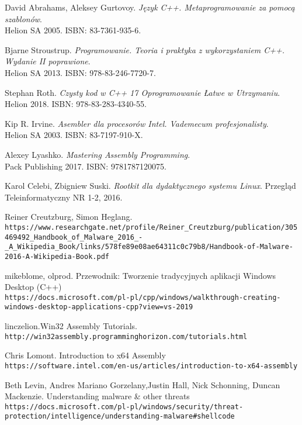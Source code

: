\begin{thebibliography}{9}
David Abrahams, Aleksey Gurtovoy.
\textit{Język C++. Metaprogramowanie za pomocą szablonów}. 
\\ Helion SA 2005. ISBN: 83-7361-935-6.


Bjarne Stroustrup.
\textit{Programowanie. Teoria i praktyka z wykorzystaniem C++. Wydanie II poprawione}. 
\\ Helion SA 2013. ISBN: 978-83-246-7720-7.


Stephan Roth.
\textit{Czysty kod w C++ 17 Oprogramowanie Łatwe w Utrzymaniu}. 
\\Helion 2018. ISBN: 978-83-283-4340-55.


Kip R. Irvine.
\textit{Asembler dla procesorów Intel. Vademecum profesjonalisty}. 
\\ Helion SA 2003. ISBN: 83-7197-910-X.


Alexey Lyashko.
\textit{Mastering Assembly Programming}. 
\\Pack Publishing 2017. ISBN: 9781787120075.



Karol Celebi, Zbigniew Suski.
\textit{Rootkit dla dydaktycznego systemu Linux}. 
Przegląd Teleinformatyczny NR 1-2, 2016.



Reiner Creutzburg, Simon Heglang.
\\\texttt{https://www.researchgate.net/profile/Reiner\_Creutzburg/publication/305469492\_Handbook\_of\_Malware\_2016\_-\_A\_Wikipedia\_Book/links/578fe89e08ae64311c0c79b8/Handbook-of-Malware-2016-A-Wikipedia-Book.pdf}


mikeblome, olprod. Przewodnik: Tworzenie tradycyjnych aplikacji Windows Desktop (C++)
\\\texttt{https://docs.microsoft.com/pl-pl/cpp/windows/walkthrough-creating-windows-desktop-applications-cpp?view=vs-2019}


linczelion.Win32 Assembly Tutorials.
\\\texttt{http://win32assembly.programminghorizon.com/tutorials.html}


Chris Lomont. Introduction to x64 Assembly
\\\texttt{https://software.intel.com/en-us/articles/introduction-to-x64-assembly}


Beth Levin, Andres Mariano Gorzelany,Justin Hall, Nick Schonning, Duncan Mackenzie. Understanding malware \& other threats
\\\texttt{https://docs.microsoft.com/pl-pl/windows/security/threat-protection/intelligence/understanding-malware\#shellcode}


\end{thebibliography}